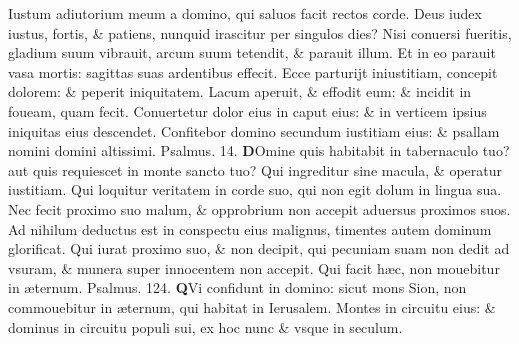 \documentclass[a5paper,10pt]{book}
\def\ae{æ}
\begin{document}
\begin{multicols*}{2}
\newline \color{red} I\color{black}ustum adiutorium meum a domino, qui saluos facit rectos corde.
\newline \color{red} D\color{black}eus iudex iustus, fortis, \& patiens, nunquid irascitur per singulos dies?
\newline \color{red} N\color{black}isi conuersi fueritis, gladium suum vibrauit, arcum suum tetendit, \& parauit illum.
\newline \color{red} E\color{black}t in eo parauit vasa mortis: sagittas suas ardentibus effecit.
\newline \color{red} E\color{black}cce parturijt iniustitiam, concepit dolorem: \& peperit iniquitatem.
\newline \color{red} L\color{black}acum aperuit, \& effodit eum: \& incidit in foueam, quam fecit.
\newline \color{red} C\color{black}onuertetur dolor eius in caput eius: \& in verticem ipsius iniquitas eius descendet.
\newline \color{red} C\color{black}onfitebor domino secundum iustitiam eius: \& psallam nomini domini altissimi. \quad \color{red} Psalmus. \hypertarget{ps14}{14.} \color{black}
\vspace{-.5em}
\lettrine[lines=2]{\bfseries \color{red} D}{}Omine quis habitabit in tabernaculo tuo? aut quis requiescet in monte sancto tuo?
\newline \color{red} Q\color{black}ui ingreditur sine macula, \& operatur iustitiam.
\newline \color{red} Q\color{black}ui loquitur veritatem in corde suo, qui non egit dolum in lingua sua.
\newline \color{red} N\color{black}ec fecit proximo suo malum, \& opprobrium non accepit aduersus proximos suos.
\newline \color{red} A\color{black}d nihilum deductus est in conspectu eius malignus, timentes autem dominum glorificat.
\newline \color{red} Q\color{black}ui iurat proximo suo, \& non decipit, qui pecuniam suam non dedit ad vsuram, \& munera super innocentem non accepit.
\newline \color{red} Q\color{black}ui facit h\ae c, non mouebitur in \ae ternum. \quad \color{red} Psalmus. \hypertarget{ps124}{124.} \color{black}
\vspace{-.5em}
\lettrine[lines=2]{\bfseries \color{red} Q}{}Vi confidunt in domino: sicut mons Sion, non commouebitur in \ae ternum, qui habitat in Ierusalem.
\newline \color{red} M\color{black}ontes in circuitu eius: \& dominus in circuitu populi sui, ex hoc nunc \& vsque in seculum.

\end{multicols*}
\end{document}
